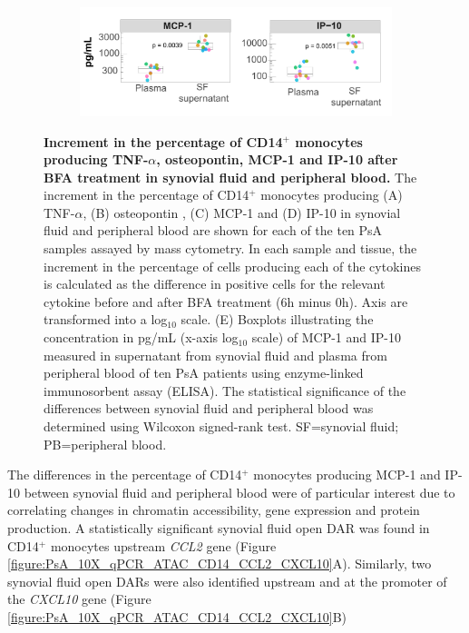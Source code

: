 \begin{figure}[H]
\begin{subfigure}[b]{0.65\textwidth}
\includegraphics[width=\textwidth]{./Results3/pdfs/ELISA_MCP1_IP10_boxplot_10_PsA_SF_plasma}
\caption{}
\end{subfigure}
\caption[Increment in the percentage of CD14$^+$ monocytes producing TNF-$\alpha$, osteopontin, MCP-1 and IP-10 after BFA treatment in synovial fluid and peripheral blood.]{\textbf{Increment in the percentage of CD14$^+$ monocytes producing TNF-$\alpha$, osteopontin, MCP-1 and IP-10 after BFA treatment in synovial fluid and peripheral blood.} The increment in the percentage of CD14$^+$ monocytes producing (A) TNF-$\alpha$, (B) osteopontin , (C) MCP-1 and (D) IP-10 in synovial fluid and peripheral blood are shown for each of the ten PsA samples assayed by mass cytometry. In each sample and tissue, the increment in the percentage of cells producing each of the cytokines is calculated as the difference in positive cells for the relevant cytokine before and after BFA treatment (6h minus 0h). Axis are transformed into a log$_{10}$ scale. (E) Boxplots illustrating the concentration in pg/mL (x-axis log$_{10}$ scale) of MCP-1 and IP-10 measured in supernatant from synovial fluid and plasma from peripheral blood of ten PsA patients using enzyme-linked immunosorbent assay (ELISA). The statistical significance of the differences between synovial fluid and peripheral blood was determined using Wilcoxon signed-rank test. SF=synovial fluid; PB=peripheral blood.}
\label{figure:CyTOF_cytokines_validation_cohort}
\end{figure}





The differences in the percentage of CD14$^+$ monocytes producing MCP-1 and IP-10 between synovial fluid and peripheral blood were of particular interest due to correlating changes in chromatin accessibility, gene expression and protein production. A statistically significant synovial fluid open DAR was found in CD14$^+$ monocytes upstream \textit{CCL2} gene (Figure \ref{figure:PsA_10X_qPCR_ATAC_CD14_CCL2_CXCL10}A). Similarly, two synovial fluid open DARs were also identified upstream and at the promoter of the \textit{CXCL10} gene (Figure \ref{figure:PsA_10X_qPCR_ATAC_CD14_CCL2_CXCL10}B)


